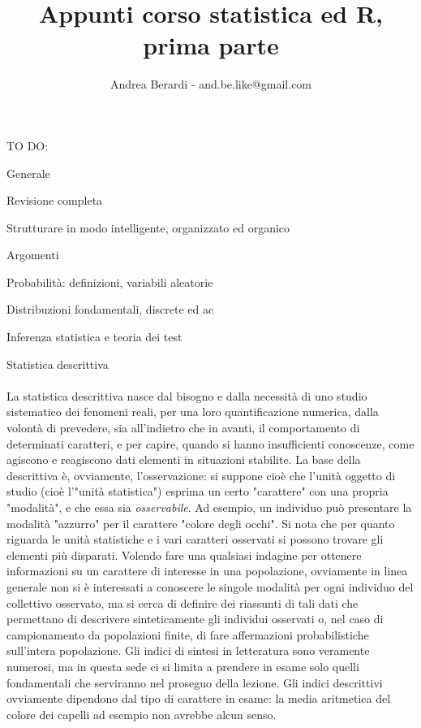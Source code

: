 \documentclass{book}
\title{Appunti corso statistica ed R, prima parte}
\author{Andrea Berardi - and.be.like@gmail.com}
\begin{document}

\maketitle

TO DO:
\begin{list}{*}{}
\item Generale
\begin{list}{-}{}
\item Revisione completa
\item Strutturare in modo intelligente, organizzato ed organico
\end{list}
\item Argomenti
\begin{list}{-}{}
\item Probabilit\`{a}: definizioni, variabili aleatorie
\item Distribuzioni fondamentali, discrete ed ac
\item Inferenza statistica e teoria dei test
\end{list}
\end{list}




\huge{Statistica descrittiva}
\normalsize \\ \\
La statistica descrittiva nasce dal bisogno e dalla necessit\`{a} di uno studio sistematico dei fenomeni reali, per una loro quantificazione numerica, dalla volont\`{a} di prevedere, sia all'indietro che in avanti, il comportamento di determinati caratteri, e per capire, quando si hanno insufficienti conoscenze, come agiscono e reagiscono dati elementi in situazioni stabilite.
La base della descrittiva \`{e}, ovviamente, l'osservazione: si suppone cio\`{e} che l'unit\`{a} oggetto di studio (cio\`{e} l'"unit\`{a} statistica") esprima un certo "carattere" con una propria "modalit\`{a}", e che essa sia \emph{osservabile}.
Ad esempio, un individuo può presentare la modalit\`{a} "azzurro" per il carattere "colore degli occhi". Si nota che per quanto riguarda le unit\`{a} statistiche e i vari caratteri osservati si possono trovare gli elementi più disparati.
Volendo fare una qualsiasi indagine per ottenere informazioni su un carattere di interesse in una popolazione, ovviamente in linea generale non si \`{e} interessati a conoscere le singole modalit\`{a} per ogni individuo del collettivo osservato, ma si cerca di definire dei riassunti di tali dati che permettano di descrivere sinteticamente gli individui osservati o, nel caso di campionamento da popolazioni finite, di fare affermazioni probabilistiche sull'intera popolazione.
Gli indici di sintesi in letteratura sono veramente numerosi, ma in questa sede ci si limita a prendere in esame solo quelli fondamentali che serviranno nel proseguo della lezione.
Gli indici descrittivi ovviamente dipendono dal tipo di carattere in esame: la media aritmetica del colore dei capelli ad esempio non avrebbe alcun senso.
\end{document}
